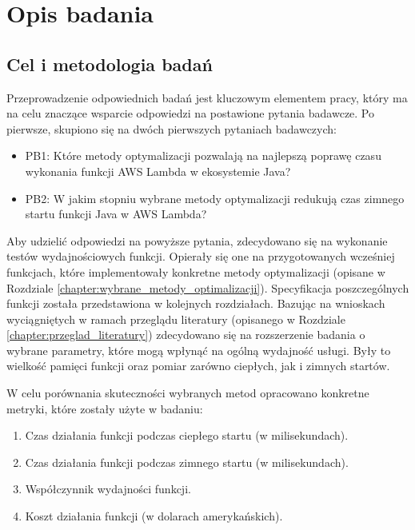 \chapter{Opis badania}\label{chapter:opis_badania}

\section{Cel i metodologia badań}\label{chapter:cel_i_metodologia_badan}

Przeprowadzenie odpowiednich badań jest kluczowym elementem pracy, który ma na celu znaczące wsparcie odpowiedzi na postawione pytania badawcze.
Po pierwsze, skupiono się na dwóch pierwszych pytaniach badawczych:
\begin{itemize}
    \item PB1: Które metody optymalizacji pozwalają na najlepszą poprawę czasu wykonania funkcji AWS Lambda w ekosystemie Java?
    \item PB2: W jakim stopniu wybrane metody optymalizacji redukują czas zimnego startu funkcji Java w AWS Lambda?
\end{itemize}
Aby udzielić odpowiedzi na powyższe pytania, zdecydowano się na wykonanie testów wydajnościowych funkcji.
Opierały się one na przygotowanych wcześniej funkcjach, które implementowały konkretne metody optymalizacji (opisane w Rozdziale \ref{chapter:wybrane_metody_optimalizacji}).
Specyfikacja poszczególnych funkcji została przedstawiona w kolejnych rozdziałach.
Bazując na wnioskach wyciągniętych w ramach przeglądu literatury (opisanego w Rozdziale \ref{chapter:przeglad_literatury}) zdecydowano się na rozszerzenie badania o wybrane parametry, które mogą wpłynąć na ogólną wydajność usługi.
Były to wielkość pamięci funkcji oraz pomiar zarówno ciepłych, jak i zimnych startów.  

W celu porównania skuteczności wybranych metod opracowano konkretne metryki, które zostały użyte w badaniu:
\begin{enumerate}
    \item Czas działania funkcji podczas ciepłego startu (w milisekundach).
    \item Czas działania funkcji podczas zimnego startu (w milisekundach).
    \item Współczynnik wydajności funkcji.
    \item Koszt działania funkcji (w dolarach amerykańskich).
\end{enumerate}

